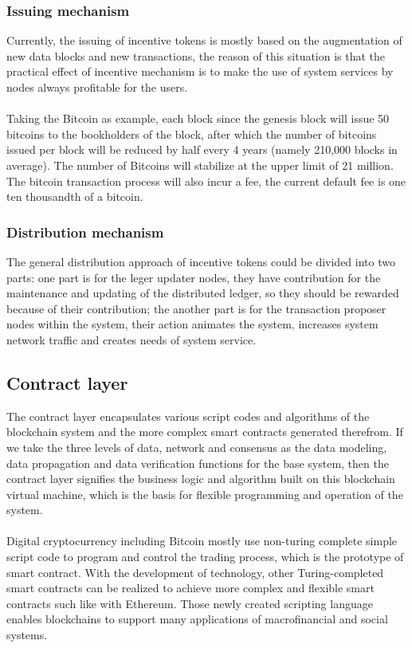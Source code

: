\documentclass[doublespacing]{bmcart}
\begin{document}
\begin{CJK*}{UTF8}{gbsn}
\subsubsection*{Issuing mechanism}
Currently, the issuing of incentive tokens is mostly based on the augmentation of new data blocks and new transactions, the reason of this situation is that the  practical effect of incentive mechanism is to make the use of system services by nodes always profitable for the users.
\paragraph{} Taking the Bitcoin as example, each block since the genesis block will issue 50 bitcoins to the bookholders of the block, after which the number of bitcoins issued per block will be reduced by half every 4 years (namely 210,000 blocks in average). The number of Bitcoins will stabilize at the upper limit of 21 million. The bitcoin transaction process will also incur a fee, the current default fee is one ten thousandth of a bitcoin.
\subsubsection*{Distribution mechanism}
The general distribution approach of incentive tokens could be divided into two parts: one part is for the leger updater nodes, they have contribution for the maintenance and updating of the distributed ledger, so they should be rewarded because of their contribution; the another part is for the transaction proposer nodes within the system, their action animates the system, increases system network traffic and creates needs of system service. 
\subsection{Contract layer}
The contract layer encapsulates various script codes and algorithms of the blockchain system and the more complex smart contracts generated therefrom. If we take the three levels of data, network and consensus as the data modeling, data propagation and data verification functions for the base system, then the contract layer signifies the business logic and algorithm built on this blockchain virtual machine, which is the basis for flexible programming and operation of the system. 
\paragraph{} Digital cryptocurrency including Bitcoin mostly use non-turing complete simple script code to program and control the trading process, which is the prototype of smart contract. With the development of technology, other Turing-completed smart contracts can be realized to achieve more complex and flexible smart contracts such like with Ethereum. Those newly created scripting language enables blockchains to support many applications of macrofinancial and social systems.

\end{CJK*}
\end{document}
